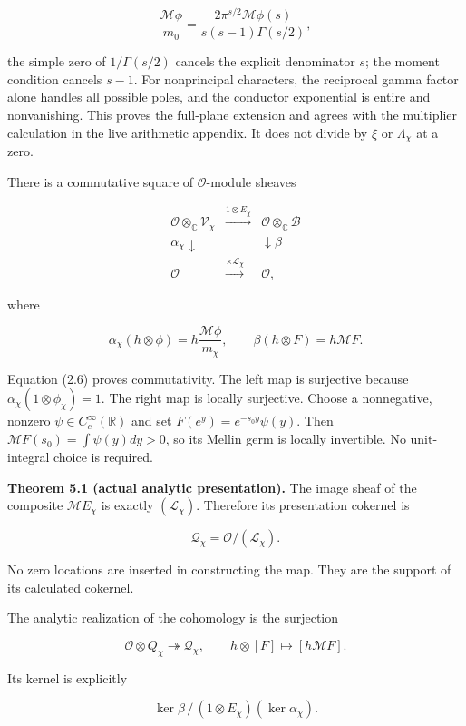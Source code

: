 \documentclass[
]{article}
\begin{document}
\[
\frac{\mathcal M\phi}{m_0}
=\frac{2\pi^{s/2}\mathcal M\phi(s)}{s(s-1)\Gamma(s/2)},
\]

the simple zero of \(1/\Gamma(s/2)\) cancels the explicit denominator
\(s\); the moment condition cancels \(s-1\). For nonprincipal
characters, the reciprocal gamma factor alone handles all possible
poles, and the conductor exponential is entire and nonvanishing. This
proves the full-plane extension and agrees with the multiplier
calculation in the live arithmetic appendix. It does not divide by
\(\xi\) or \(\Lambda_\chi\) at a zero.

There is a commutative square of \(\mathcal O\)-module sheaves

\[
\begin{array}{ccc}
\mathcal O\otimes_{\mathbb C}\mathscr V_\chi&\xrightarrow{1\otimes E_\chi}&\mathcal O\otimes_{\mathbb C}\mathscr B\\
\alpha_\chi\downarrow&&\downarrow\beta\\
\mathcal O&\xrightarrow{\times\mathscr L_\chi}&\mathcal O,
\end{array} \tag{5.3}
\]

where

\[
\alpha_\chi(h\otimes\phi)=h\frac{\mathcal M\phi}{m_\chi},
\qquad\beta(h\otimes F)=h\mathcal MF.
\]

Equation (2.6) proves commutativity. The left map is surjective because
\(\alpha_\chi(1\otimes\phi_\chi)=1\). The right map is locally
surjective. Choose a nonnegative, nonzero
\(\psi\in C_c^\infty(\mathbb R)\) and set \(F(e^y)=e^{-s_0y}\psi(y)\).
Then \(\mathcal MF(s_0)=\int\psi(y)dy>0\), so its Mellin germ is locally
invertible. No unit-integral choice is required.

\textbf{Theorem 5.1 (actual analytic presentation).} The image sheaf of
the composite \(\mathcal M E_\chi\) is exactly \((\mathscr L_\chi)\).
Therefore its presentation cokernel is

\[
\boxed{\mathcal Q_\chi=\mathcal O/(\mathscr L_\chi).} \tag{5.4}
\]

No zero locations are inserted in constructing the map. They are the
support of its calculated cokernel.

The analytic realization of the cohomology is the surjection

\[
\mathcal O\otimes Q_\chi\twoheadrightarrow\mathcal Q_\chi,
\qquad h\otimes[F]\mapsto[h\mathcal MF]. \tag{5.5}
\]

Its kernel is explicitly

\[
\boxed{\ker\beta\,/\,(1\otimes E_\chi)(\ker\alpha_\chi).} \tag{5.6}
\]
\end{document}
